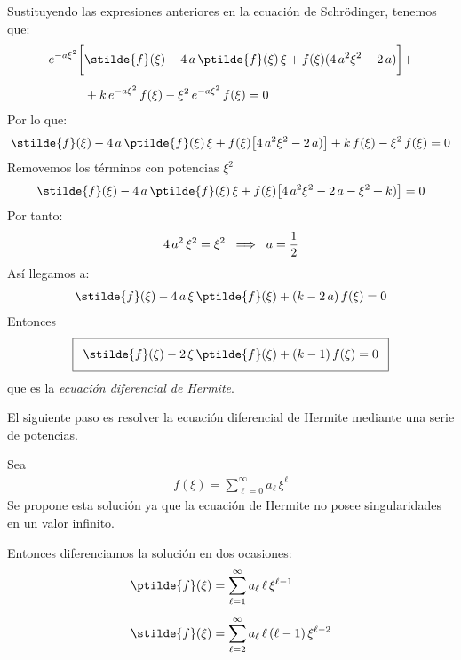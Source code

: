 Sustituyendo las expresiones anteriores en la ecuación de Schrödinger, tenemos que:
\begin{align*}
e^{-a \xi^{2}} \bigg[ &\stilde{f}(\xi) - 4 \, a \, \ptilde{f}(\xi) \, \xi + f(\xi) (4 \, a^{2} \xi^{2} - 2 \, a) \bigg] + \\[0.5em]
&+ k \, e^{-a \xi^{2}} \, f(\xi) - \xi^{2} \, e^{-a \xi^{2}} \, f(\xi) = 0
\end{align*}
Por lo que:
\begin{align*}
\stilde{f}(\xi) - 4 \, a \, \ptilde{f}(\xi) \, \xi + f(\xi) \big[ 4 \, a^{2} \xi^{2} - 2 \, a) \big] + k \, f(\xi) - \xi^{2} \, f(\xi) = 0
\end{align*}
Removemos los términos con potencias $\xi^{2}$
\begin{align*}
\stilde{f}(\xi) - 4 \, a \, \ptilde{f}(\xi) \, \xi + f(\xi) \big[ 4 \, a^{2} \xi^{2} - 2 \, a - \xi^{2} +  k) \big] = 0
\end{align*}
Por tanto:
\begin{align*}
4 \, a^{2} \, \xi^{2} =  \xi^{2} \hspace{0.2cm} \Longrightarrow \hspace{0.2cm} a = \dfrac{1}{2}
\end{align*}
Así llegamos a:
\begin{align*}
\stilde{f}(\xi) - 4 \, a \, \xi \, \ptilde{f}(\xi) + (k - 2 \, a) \, f(\xi) = 0
\end{align*}
Entonces
\begin{align*}
\addtolength{\fboxsep}{5pt}\boxed{
\stilde{f} (\xi) - 2 \, \xi \, \ptilde{f}(\xi) + (k - 1) \, f(\xi) = 0}
\end{align*}
que es la \emph{ecuación diferencial de Hermite}.
\par
El siguiente paso es resolver la ecuación diferencial de Hermite mediante una serie de potencias.
\par
Sea
\begin{align*}
f(\xi) = \sum_{\ell=0}^{\infty} a_{\ell} \, \xi^{\ell}
\end{align*}
Se propone esta solución ya que la ecuación de Hermite no posee singularidades en un valor infinito.
\par
Entonces diferenciamos la solución en dos ocasiones:
\begin{align*}
\ptilde{f}(\xi) &= \sum_{\ell=1}^{\infty} a_{\ell} \, \ell \, \xi^{\ell-1} \\[0.5em]
\stilde{f}(\xi) &= \sum_{\ell=2}^{\infty} a_{\ell} \, \ell \, (\ell - 1) \, \xi^{\ell-2} 
\end{align*}
